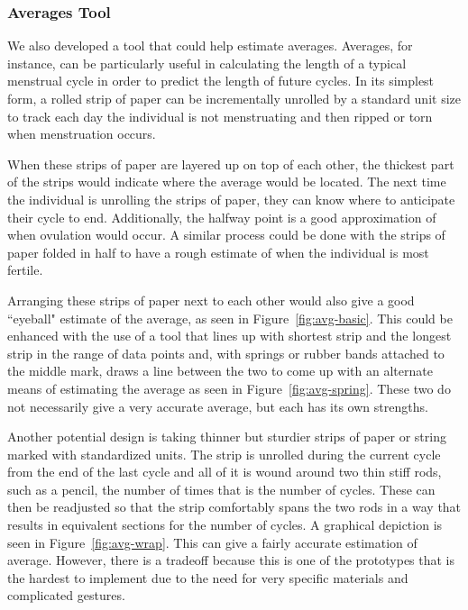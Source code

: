 \documentclass{sig-alternate}
\begin{document}
\subsubsection{Averages Tool}

We also developed a tool that could help estimate averages. Averages, for instance, can be particularly useful in calculating the length of a typical menstrual cycle in order to predict the length of future cycles. In its simplest form, a rolled strip of paper can be incrementally unrolled by a standard unit size to track each day the individual is not menstruating and then ripped or torn when menstruation occurs. 

When these strips of paper are layered up on top of each other, the thickest part of the strips would indicate where the average would be located. The next time the individual is unrolling the strips of paper, they can know where to anticipate their cycle to end. Additionally, the halfway point is a good approximation of when ovulation would occur. A similar process could be done with the strips of paper folded in half to have a rough estimate of when the individual is most fertile. 

Arranging these strips of paper next to each other would also give a good ``eyeball" estimate of the average, as seen in Figure~\ref{fig:avg-basic}. This could be enhanced with the use of a tool that lines up with shortest strip and the longest strip in the range of data points and, with springs or rubber bands attached to the middle mark, draws a line between the two to come up with an alternate means of estimating the average as seen in Figure~\ref{fig:avg-spring}. These two do not necessarily give a very accurate average, but each has its own strengths. 

Another potential design is taking thinner but sturdier strips of paper or string marked with standardized units. The strip is unrolled during the current cycle from the end of the last cycle and all of it is wound around two thin stiff rods, such as a pencil, the number of times that is the number of cycles. These can then be readjusted so that the strip comfortably spans the two rods in a way that results in equivalent sections for the number of cycles. A graphical depiction is seen in Figure~\ref{fig:avg-wrap}. This can give a fairly accurate estimation of average. However, there is a tradeoff because this is one of the prototypes that is the hardest to implement due to the need for very specific materials and complicated gestures.
\end{document}
